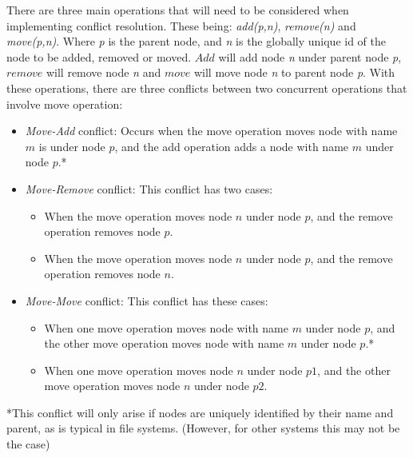 \documentclass[12pt]{article}
\begin{document}
There are three main operations that will need to be considered when implementing conflict resolution. These being: \textit{add(p,n)}, \textit{remove(n)} and \textit{move(p,n)}. Where \textit{p} is the parent node, and \textit{n} is the globally unique id of the node to be added, removed or moved. $Add$ will add node \textit{n} under parent node \textit{p}, $remove$ will remove node \textit{n} and $move$ will move node \textit{n} to parent node \textit{p}. With these operations, there are three conflicts between two concurrent operations that involve move operation:
\begin{itemize}
    \item
        \textit{Move-Add} conflict: Occurs when the move operation moves node with name $m$ is under node $p$, and the add operation adds a node with name $m$ under node $p$.*
    \item
        \textit{Move-Remove} conflict: This conflict has two cases:
        \begin{itemize}
            \item 
                When the move operation moves node $n$ under node $p$, and the remove operation removes node $p$.
            \item
                When the move operation moves node $n$ under node $p$, and the remove operation removes node $n$.
        \end{itemize}
    \item
        \textit{Move-Move} conflict: This conflict has these cases:
        \begin{itemize}
            \item 
                When one move operation moves node with name $m$ under node $p$, and the other move operation moves node with name $m$ under node $p$.*
            \item 
                When one move operation moves node $n$ under node $p1$, and the other move operation moves node $n$ under node $p2$.
        \end{itemize}
\end{itemize}

*This conflict will only arise if nodes are uniquely identified by their name and parent, as is typical in file systems. (However, for other systems this may not be the case)
\end{document}
